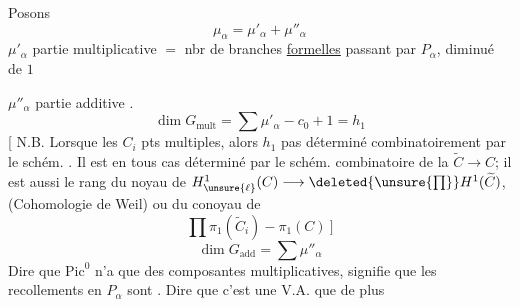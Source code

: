 Posons
\[
\mu_\alpha=\mu'_\alpha+\mu''_\alpha
\]
$\mu'_\alpha$ partie multiplicative $=$ nbr de branches \uline{formelles} passant par $P_\alpha$, diminué de $1$

$\mu''_\alpha$ partie additive .
\[
\dim G_{\mathrm{mult}}=\sum\mu'_\alpha-c_0+1=h_1
\]
[ N.B. Lorsque les $C_i$  pts multiples, alors $h_1$  pas déterminé  combinatoirement par le schém.
. Il est en tous cas déterminé par le schém. combinatoire de la  $\widetilde C\longrightarrow C$; il est aussi le rang du \deleted{$\unsure{\Pi}$} noyau de
$H^1_{\unsure{\ell}}(C)\longrightarrow\deleted{\unsure{\prod}}H^1(\widetilde C)$, (Cohomologie de Weil) ou du conoyau de
\[
\prod\pi_1(\widetilde C_i)-\pi_1(C)\ ]
\]
\[
\dim G_{\mathrm{add}}=\sum\mu''_\alpha
\]
Dire que $\mathrm{Pic}^0$ n'a que des composantes  multiplicatives, signifie que les recollements en $P_\alpha$ sont .
Dire que c'est une V.A.   que  de plus

